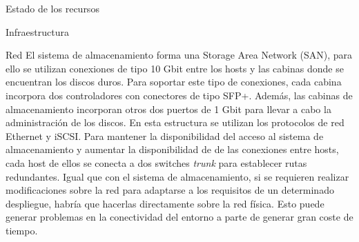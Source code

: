 \begin{chapter}{Estado de los recursos}
\begin{section}{Infraestructura}
\begin{subsection}{Red}
    El sistema de almacenamiento forma una Storage Area Network (SAN), para ello se utilizan conexiones de tipo 10 Gbit entre los hosts y las cabinas donde se encuentran los discos duros. Para soportar este tipo de conexiones, cada cabina incorpora dos controladores con conectores de tipo SFP+. Además, las cabinas de almacenamiento incorporan otros dos puertos de 1 Gbit para llevar a cabo la administración de los discos. En esta estructura se utilizan los protocolos de red Ethernet y iSCSI. Para mantener la disponibilidad del acceso al sistema de almacenamiento y aumentar la disponibilidad de de las conexiones entre hosts, cada host de ellos se conecta a dos switches \textit{trunk} para establecer rutas redundantes.
    Igual que con el sistema de almacenamiento, si se requieren realizar modificaciones sobre la red para adaptarse a los requisitos de un determinado despliegue, habría que hacerlas directamente sobre la red física. Esto puede generar problemas en la conectividad del entorno a parte de generar gran coste de tiempo.

\end{subsection}

\end{section}


\end{chapter}
